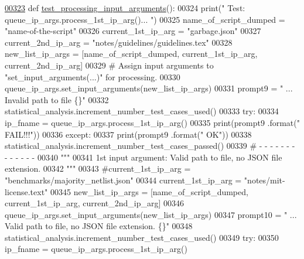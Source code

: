 \begin{DoxyCode}
\hypertarget{classutilities_1_1queue__ip__arguments__tester_1_1queue__ip__args__tester_l00323}{}\hyperlink{classutilities_1_1queue__ip__arguments__tester_1_1queue__ip__args__tester_a53e53ec2797918a6488b0d75ba437407}{00323}     \textcolor{keyword}{def }\hyperlink{classutilities_1_1queue__ip__arguments__tester_1_1queue__ip__args__tester_a53e53ec2797918a6488b0d75ba437407}{test\_processing\_input\_arguments}():
00324         print(\textcolor{stringliteral}{" Test: queue\_ip\_args.process\_1st\_ip\_arg()... "})
00325         name\_of\_script\_dumped = \textcolor{stringliteral}{"name-of-the-script"}
00326         current\_1st\_ip\_arg = \textcolor{stringliteral}{"garbage.json"}
00327         current\_2nd\_ip\_arg = \textcolor{stringliteral}{"notes/guidelines/guidelines.tex"}
00328         new\_list\_ip\_args = [name\_of\_script\_dumped, current\_1st\_ip\_arg, current\_2nd\_ip\_arg]
00329         \textcolor{comment}{#   Assign input arguments to "set\_input\_arguments(...)" for processing.}
00330         queue\_ip\_args.set\_input\_arguments(new\_list\_ip\_args)
00331         prompt9 = \textcolor{stringliteral}{" ... Invalid path to file    \{\}"}
00332         statistical\_analysis.increment\_number\_test\_cases\_used()
00333         \textcolor{keywordflow}{try}:
00334             ip\_fname = queue\_ip\_args.process\_1st\_ip\_arg()
00335             print(prompt9 .format(\textcolor{stringliteral}{"     FAIL!!!"}))
00336         \textcolor{keywordflow}{except}:
00337             print(prompt9 .format(\textcolor{stringliteral}{"         OK"}))
00338             statistical\_analysis.increment\_number\_test\_cases\_passed()
00339         \textcolor{comment}{#   -   -   -   -   -   -   -   -   -   -   -   -   -}
00340         \textcolor{stringliteral}{"""}
00341 \textcolor{stringliteral}{            1st input argument: Valid path to file, no JSON file extension.}
00342 \textcolor{stringliteral}{        """}
00343         \textcolor{comment}{#current\_1st\_ip\_arg = "benchmarks/majority\_netlist.json"}
00344         current\_1st\_ip\_arg = \textcolor{stringliteral}{"notes/mit-license.text"}
00345         new\_list\_ip\_args = [name\_of\_script\_dumped, current\_1st\_ip\_arg, current\_2nd\_ip\_arg]
00346         queue\_ip\_args.set\_input\_arguments(new\_list\_ip\_args)
00347         prompt10 = \textcolor{stringliteral}{"    ... Valid path to file, no JSON file extension. \{\}"}
00348         statistical\_analysis.increment\_number\_test\_cases\_used()
00349         \textcolor{keywordflow}{try}:
00350             ip\_fname = queue\_ip\_args.process\_1st\_ip\_arg()

\end{DoxyCode}
